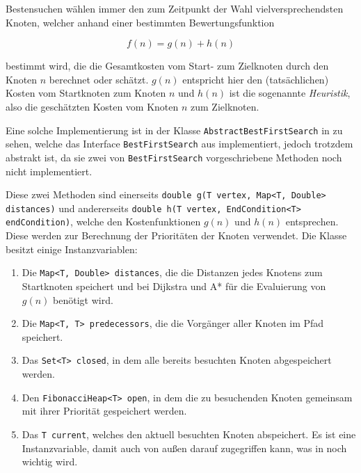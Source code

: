             Bestensuchen wählen immer den zum Zeitpunkt der Wahl vielversprechendsten Knoten, welcher anhand einer bestimmten Bewertungsfunktion
                
                \[f(n) = g(n) + h(n)\]
            
            bestimmt wird, die die Gesamtkosten vom Start- zum Zielknoten durch den Knoten $n$ berechnet oder schätzt. $g(n)$ entspricht hier den (tatsächlichen) Kosten vom Startknoten zum Knoten $n$ und $h(n)$ ist die sogenannte \emph{Heuristik}, also die geschätzten Kosten vom Knoten $n$ zum Zielknoten.

            Eine solche Implementierung ist in der Klasse \lstinline{AbstractBestFirstSearch} in  zu sehen, welche das Interface \lstinline{BestFirstSearch} aus  implementiert, jedoch trotzdem abstrakt ist, da sie zwei von \lstinline{BestFirstSearch} vorgeschriebene Methoden noch nicht implementiert.
            
            
            
            Diese zwei Methoden sind einerseits \lstinline{double g(T vertex, Map<T, Double> distances)} und andererseits \lstinline{double h(T vertex, EndCondition<T> endCondition)}, welche den Kostenfunktionen $g(n)$ und $h(n)$ entsprechen. Diese werden zur Berechnung der Prioritäten der Knoten verwendet. Die Klasse besitzt einige Instanzvariablen:

            \begin{enumerate}
                \item Die \lstinline{Map<T, Double> distances}, die die Distanzen jedes Knotens zum Startknoten speichert und bei Dijkstra und A* für die Evaluierung von $g(n)$ benötigt wird.
                
                \item Die \lstinline{Map<T, T> predecessors}, die die Vorgänger aller Knoten im Pfad speichert.
                
                \item Das \lstinline{Set<T> closed}, in dem alle bereits besuchten Knoten abgespeichert werden.
            
                \item Den \lstinline{FibonacciHeap<T> open}, in dem die zu besuchenden Knoten gemeinsam mit ihrer Priorität gespeichert werden.
                
                \item Das \lstinline{T current}, welches den aktuell besuchten Knoten abspeichert. Es ist eine Instanzvariable, damit auch von außen darauf zugegriffen kann, was in  noch wichtig wird.
            \end{enumerate}

